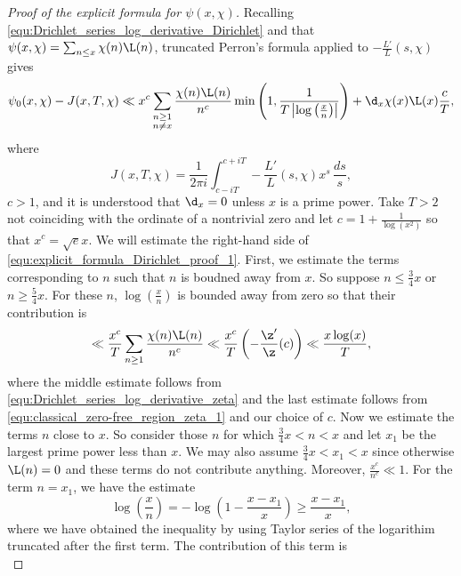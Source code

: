       \begin{proof}[Proof of the explicit formula for $\psi(x,\chi)$]
        Recalling \cref{equ:Drichlet_series_log_derivative_Dirichlet} and that $\psi(x,\chi) = \sum_{n \le x}\chi(n)\L(n)$, truncated Perron's formula applied to $-\frac{L'}{L}(s,\chi)$ gives
        \begin{equation}\label{equ:explicit_formula_Dirichlet_proof_1}
          \psi_{0}(x,\chi)-J(x,T,\chi) \ll x^{c}\sum_{\substack{n \ge 1 \\ n \neq x}}\frac{\chi(n)\L(n)}{n^{c}}\min\left(1,\frac{1}{T\left|\log\left(\frac{x}{n}\right)\right|}\right)+\d_{x}\chi(x)\L(x)\frac{c}{T},
        \end{equation}
        where
        \[
          J(x,T,\chi) = \frac{1}{2\pi i}\int_{c-iT}^{c+iT}-\frac{L'}{L}(s,\chi)x^{s}\,\frac{ds}{s},
        \]
        $c > 1$, and it is understood that $\d_{x} = 0$ unless $x$ is a prime power. Take $T > 2$ not coinciding with the ordinate of a nontrivial zero and let $c = 1+\frac{1}{\log(x^{2})}$ so that $x^{c} = \sqrt{e}x$. We will estimate the right-hand side of \cref{equ:explicit_formula_Dirichlet_proof_1}. First, we estimate the terms corresponding to $n$ such that $n$ is boudned away from $x$. So suppose $n \le \frac{3}{4}x$ or $n \ge \frac{5}{4}x$. For these $n$, $\log\left(\frac{x}{n}\right)$ is bounded away from zero so that their contribution is
        \begin{equation}\label{equ:explicit_formula_Dirichlet_proof_2}
          \ll \frac{x^{c}}{T}\sum_{n \ge 1}\frac{\chi(n)\L(n)}{n^{c}} \ll \frac{x^{c}}{T}\left(-\frac{\z'}{\z}(c)\right) \ll \frac{x\log(x)}{T},
        \end{equation}
        where the middle estimate follows from \cref{equ:Drichlet_series_log_derivative_zeta} and the last estimate follows from \cref{equ:classical_zero-free_region_zeta_1} and our choice of $c$. Now we estimate the terms $n$ close to $x$. So consider those $n$ for which $\frac{3}{4}x < n < x$ and let $x_{1}$ be the largest prime power less than $x$. We may also assume $\frac{3}{4}x < x_{1} < x$ since otherwise $\L(n) = 0$ and these terms do not contribute anything. Moreover, $\frac{x^{c}}{n^{c}} \ll 1$. For the term $n = x_{1}$, we have the estimate
        \[
          \log\left(\frac{x}{n}\right) = -\log\left(1-\frac{x-x_{1}}{x}\right) \ge \frac{x-x_{1}}{x},
        \]
        where we have obtained the inequality by using Taylor series of the logarithim truncated after the first term. The contribution of this term is
        \begin{equation}\label{equ:explicit_formula_Dirichlet_proof_3}

\end{equation}
\end{proof}
